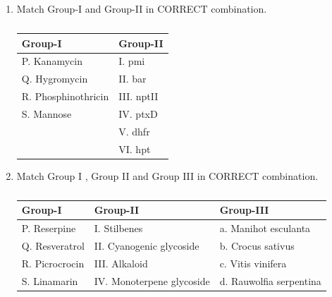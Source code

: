 \documentclass[journal,12pt,onecolumn]{IEEEtran}
\theoremstyle{remark}
\begin{document}
\begin{enumerate}
    \item Match Group-I  and Group-II  in CORRECT combination.

    \hfill{}

    \begin{table}[h!]
    \centering
    \caption*{}
    \label{tab:q58}
    \begin{tabular}{ll}
    \hline
    \textbf{Group-I} & \textbf{Group-II} \\
    \hline
    P. Kanamycin & I. pmi \\
    Q. Hygromycin & II. bar \\
    R. Phosphinothricin & III. nptII \\
    S. Mannose & IV. ptxD \\
     & V. dhfr \\
     & VI. hpt \\
    \hline
    \end{tabular}
    \end{table}

    \begin{enumerate}
    \end{enumerate}

    \item Match Group I , Group II  and Group III  in CORRECT combination.

    \hfill{}

    \begin{table}[h!]
    \centering
    \caption*{}
    \label{tab:q59}
    \begin{tabular}{lll}
    \hline
    \textbf{Group-I} & \textbf{Group-II} & \textbf{Group-III} \\
    \hline
    P. Reserpine & I. Stilbenes & a. Manihot esculanta \\
    Q. Resveratrol & II. Cyanogenic glycoside & b. Crocus sativus \\
    R. Picrocrocin & III. Alkaloid & c. Vitis vinifera \\
    S. Linamarin & IV. Monoterpene glycoside & d. Rauwolfia serpentina \\
    \hline
    \end{tabular}
    \end{table}


\end{enumerate}
\end{document}
